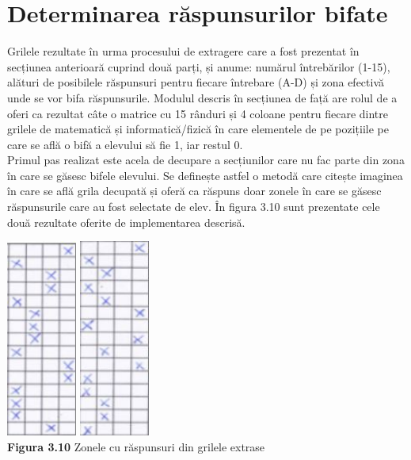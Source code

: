 \documentclass[a4paper,12pt]{report}
\newcommand\tab[1][1cm]{\hspace*{#1}}
\begin{document}
\section{Determinarea răspunsurilor bifate}
\tab Grilele rezultate în urma procesului de extragere care a fost prezentat în secțiunea anterioară cuprind două parți, și anume: numărul întrebărilor (1-15), alături de posibilele răspunsuri pentru fiecare întrebare (A-D) și zona efectivă unde se vor bifa răspunsurile. Modulul descris în secțiunea de față are rolul de a oferi ca rezultat câte o matrice cu 15 rânduri și 4 coloane pentru fiecare dintre grilele de matematică și informatică/fizică în care elementele de pe pozițiile pe care se află o bifă a elevului să fie 1, iar restul 0. 
\\ \tab Primul pas realizat este acela de decupare a secțiunilor care nu fac parte din zona în care se găsesc bifele elevului. Se definește astfel o metodă care citește imaginea în care se află grila decupată și oferă ca răspuns doar zonele în care se găsesc răspunsurile care au fost selectate de elev. În figura 3.10 sunt prezentate cele două rezultate oferite de implementarea descrisă.
\begin {center} 
	\begin {footnotesize} 
		\includegraphics[width = 23mm]{fig3_10_1} 
		\includegraphics[width = 23mm]{fig3_10_2} \\
		\textbf  {Figura 3.10} Zonele cu răspunsuri din grilele extrase
	\end {footnotesize} 
\end {center}
\end{document}
